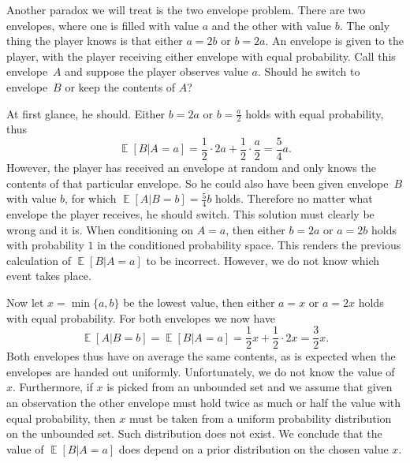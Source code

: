 \documentclass[a4paper]{report}
\theoremstyle{plain}
\theoremstyle{definition}
\theoremstyle{remark}
\numberwithin{equation}{chapter}
\DeclareMathOperator{\E}{\mathbb{E}}
\DeclareMathOperator{\1}{\mathbbm{1}}
\begin{document}
Another paradox we will treat is the two envelope problem. There are two envelopes, where one is filled with value $a$ and the other with value $b$. The only thing the player knows is that either $a=2b$ or $b=2a$. An envelope is given to the player, with the player receiving either envelope with equal probability. Call this envelope~$A$ and suppose the player observes value $a$. Should he switch to envelope~$B$ or keep the contents of $A$?

At first glance, he should. Either $b=2a$ or $b=\frac{a}{2}$ holds with equal probability, thus \[\E[B|A=a]=\frac{1}{2}\cdot2a+\frac{1}{2}\cdot\frac{a}{2}=\frac{5}{4}a.\]
However, the player has received an envelope at random and only knows the contents of that particular envelope. So he could also have been given envelope~$B$ with value $b$, for which $\E[A|B=b]=\frac{5}{4}b$ holds. Therefore no matter what envelope the player receives, he should switch. This solution must clearly be wrong and it is. When conditioning on $A=a$, then either $b=2a$ or $a=2b$ holds with probability $1$ in the conditioned probability space. This renders the previous calculation of $\E[B|A=a]$ to be incorrect. However, we do not know which event takes place.

Now let $x=\min\{a,b\}$ be the lowest value, then either $a=x$ or $a=2x$ holds with equal probability. For both envelopes we now have
\[
\E[A|B=b]=\E[B|A=a]=\frac{1}{2}x+\frac{1}{2}\cdot2x=\frac{3}{2}x.
\]
Both envelopes thus have on average the same contents, as is expected when the envelopes are handed out uniformly. Unfortunately, we do not know the value of $x$. Furthermore, if $x$ is picked from an unbounded set and we assume that given an observation the other envelope must hold twice as much or half the value with equal probability, then $x$ must be taken from a uniform probability distribution on the unbounded set. Such distribution does not exist. We conclude that the value of $\E[B|A=a]$ does depend on a prior distribution on the chosen value $x$.
\end{document}
